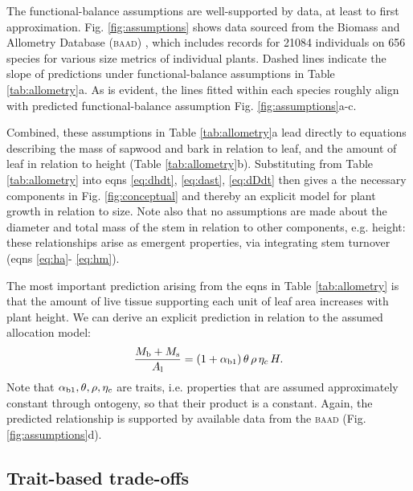 \documentclass[a4paper,11pt]{article}
\begin{document}
The functional-balance assumptions are well-supported by data, at least to first approximation. Fig. \ref{fig:assumptions} shows data sourced from the Biomass and Allometry Database (\textsc{baad}) \citep{Falster-2015b}, which includes records for 21084 individuals on 656 species for various size metrics of individual plants. Dashed lines indicate the slope of predictions under functional-balance assumptions in Table \ref{tab:allometry}a. As is evident, the lines fitted within each species roughly align with predicted functional-balance assumption Fig. \ref{fig:assumptions}a-c.

Combined, these assumptions in Table \ref{tab:allometry}a lead directly to equations describing the mass of sapwood and bark in relation to leaf, and the amount of leaf in relation to height (Table \ref{tab:allometry}b). Substituting from Table \ref{tab:allometry} into eqns \ref{eq:dhdt}, \ref{eq:dast}, \ref{eq:dDdt} then gives a the necessary components in Fig. \ref{fig:conceptual} and thereby an explicit model for plant growth in relation to size. Note also that no assumptions are made about the diameter and total mass of the stem in relation to other components, e.g. height: these relationships arise as emergent properties, via integrating stem turnover (eqns \ref{eq:ha}- \ref{eq:hm}).

The most important prediction arising from the eqns in Table \ref{tab:allometry} is that the amount of live tissue supporting each unit of leaf area increases with plant height. We can derive an explicit prediction in relation to the assumed allocation model:
\begin{equation}\label{eq:msml}
\frac{M_{\rm b} + M_{\rm s}}{A_{\rm l}} = (1+ \alpha_{\rm b1}) \,\theta \, \rho \, \eta_c \, H.
\end{equation}
Note that $\alpha_{\rm b1}, \theta, \rho, \eta_c$ are traits, i.e. properties that are assumed approximately constant through ontogeny, so that their product is a constant. Again, the predicted relationship is supported by available data from the \textsc{baad} (Fig. \ref{fig:assumptions}d).

\subsection{Trait-based trade-offs}
\end{document}
